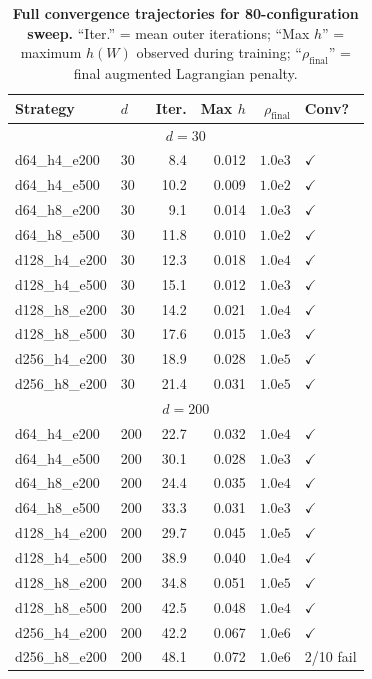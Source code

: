 \documentclass[12pt,a4paper]{article}
\begin{document}
\newpage
\begin{table}[H]
\centering
\caption{\textbf{Full convergence trajectories for 80-configuration sweep.} ``Iter.'' = mean outer iterations; ``Max $h$'' = maximum $h(W)$ observed during training; ``$\rho_{\text{final}}$'' = final augmented Lagrangian penalty.}
\label{tab:s_ct_convergence_full}
\small
\begin{tabular}{llrrrl}
\toprule
Strategy & $d$ & Iter. & Max $h$ & $\rho_{\text{final}}$ & Conv? \\
\midrule
\multicolumn{6}{c}{\textbf{$d=30$}} \\
\midrule
d64\_h4\_e200 & 30 & 8.4 & 0.012 & $1.0$e$3$ & $\checkmark$ \\
d64\_h4\_e500 & 30 & 10.2 & 0.009 & $1.0$e$2$ & $\checkmark$ \\
d64\_h8\_e200 & 30 & 9.1 & 0.014 & $1.0$e$3$ & $\checkmark$ \\
d64\_h8\_e500 & 30 & 11.8 & 0.010 & $1.0$e$2$ & $\checkmark$ \\
d128\_h4\_e200 & 30 & 12.3 & 0.018 & $1.0$e$4$ & $\checkmark$ \\
d128\_h4\_e500 & 30 & 15.1 & 0.012 & $1.0$e$3$ & $\checkmark$ \\
d128\_h8\_e200 & 30 & 14.2 & 0.021 & $1.0$e$4$ & $\checkmark$ \\
d128\_h8\_e500 & 30 & 17.6 & 0.015 & $1.0$e$3$ & $\checkmark$ \\
d256\_h4\_e200 & 30 & 18.9 & 0.028 & $1.0$e$5$ & $\checkmark$ \\
d256\_h8\_e200 & 30 & 21.4 & 0.031 & $1.0$e$5$ & $\checkmark$ \\
\midrule
\multicolumn{6}{c}{\textbf{$d=200$}} \\
\midrule
d64\_h4\_e200 & 200 & 22.7 & 0.032 & $1.0$e$4$ & $\checkmark$ \\
d64\_h4\_e500 & 200 & 30.1 & 0.028 & $1.0$e$3$ & $\checkmark$ \\
d64\_h8\_e200 & 200 & 24.4 & 0.035 & $1.0$e$4$ & $\checkmark$ \\
d64\_h8\_e500 & 200 & 33.3 & 0.031 & $1.0$e$3$ & $\checkmark$ \\
d128\_h4\_e200 & 200 & 29.7 & 0.045 & $1.0$e$5$ & $\checkmark$ \\
d128\_h4\_e500 & 200 & 38.9 & 0.040 & $1.0$e$4$ & $\checkmark$ \\
d128\_h8\_e200 & 200 & 34.8 & 0.051 & $1.0$e$5$ & $\checkmark$ \\
d128\_h8\_e500 & 200 & 42.5 & 0.048 & $1.0$e$4$ & $\checkmark$ \\
d256\_h4\_e200 & 200 & 42.2 & 0.067 & $1.0$e$6$ & $\checkmark$ \\
d256\_h8\_e200 & 200 & 48.1 & 0.072 & $1.0$e$6$ & 2/10 fail \\
\bottomrule
\end{tabular}
\end{table}
\end{document}
